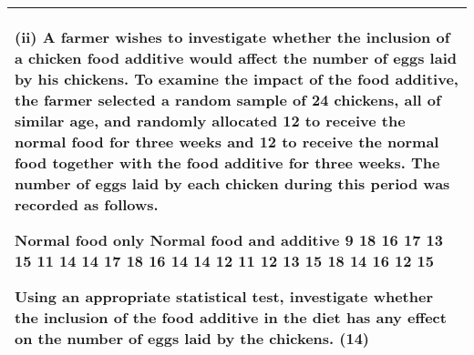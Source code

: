 \documentclass[a4paper,12pt]{article}
\begin{document}
\begin{table}[ht!]
 
\centering
 
\begin{tabular}{|p{15cm}|}
 
\hline  
 
(ii) A farmer wishes to investigate whether the inclusion of a chicken food additive would affect the number of eggs laid by his chickens.  
To examine the impact of the food additive, the farmer selected a random sample of 24 chickens, all of similar age, and randomly allocated 12 
to receive the normal food for three weeks and 12 to receive the normal food together with the food additive for three weeks.  
The number of eggs laid by each chicken during this period was recorded as follows. 
 
 
Normal food only Normal food and additive   9 18 16 17 13 15 11 14 14 17 18 16 14 14 12 11 12 13 15 18 14 16 12 15 
 
 
Using an appropriate statistical test, investigate whether the inclusion of the food additive in the diet has any effect on the number of eggs laid by the chickens. (14) 
\\ \hline
  
\end{tabular}

\end{table} 
\end{document}
